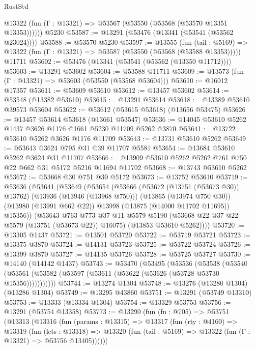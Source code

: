 \begin{lexlean}{RustStd}
\begin{coremodule}
      @13322 (fun (Γ : @13321) => @53567 (@53550 (@53568 (@53570 @13351 @13353))))))
    @5230
@53587 := @13291 (@53476 (@13341 (@53541 (@53562 @23024))))
@53588 := @53570 @5230
@53597 := @13555
    (fun (tail : @5169) => @13322 (fun (Γ : @13321) => @53587 (@53550 (@53568 (@53588 @13353)))))
    @11711
@53602 := @53476 (@13341 (@53541 (@53562 (@13350 @11712))))
@53603 := @13291 @53602
@53604 := @53588 @11711
@53609 := @13573 (fun (Γ : @13321) => @53603 (@53550 (@53568 @53604)))
@53610 := @16012 @17357
@53611 := @53609 @53610
@53612 := @13457 @53602
@53614 := @53548 (@13382 @53610)
@53615 := @13291 @53614
@53618 := @13389 @53610 @39573 @53604
@53622 := @53612 (@53615 @53618) (@13656 @53475)
@53626 := @13457 @53614 @53618 (@13661 @53547)
@53636 := @14045 @53610 @5262 @1437 @3626 @1176 @1661 @5230 @11709 @5262 @3870
@53641 := @13722 @53610 @5262 @3626 @1176 @11709
@53643 := @13731 @53610 @5262
@53649 := @53643 @3624 @795 @31 @39 @11707 @5581
@53654 := @13684 @53610 @5262 @3624 @31 @11707
@53666 := @13909 @53610 @5262 @5262 @761 @750 @22 @662 @31 @5172 @5216 @11694 @11702
@53668 := @13743 @53610 @5262
@53672 := @53668 @30 @751 @30 @5172
@53673 := @13752 @53610
@53719 := @53636
    (@53641
      (@53649
        (@53654
          (@53666
            (@53672 (@13751 (@53673 @30)) @13762)
            (@13936 (@13946 (@13968 @750)))
            (@13865 (@13974 @750 @30))
            (@13980 (@13991 @662 @22))
            @13998
            (@13875 (@14000 @11702 @11695))
            @15356))
        (@53643
          @763
          @773
          @37
          @11
          @5579
          @5190
          (@53668 @22 @37 @22 @5579 (@13751 (@53673 @22)) @16075)
          (@13853 @53610 @5262))))
@53720 := @13305 @1437
@53721 := @13501 @53720
@53722 := @53719 @53721
@53723 := @13375 @3870
@53724 := @14131 @53723
@53725 := @53722 @53724
@53726 := @13399 @3870
@53727 := @14135 @53726
@53728 := @53725 @53727
@53730 := @14140 (@14142 @1437)
@53743 := @53470
    (@53495
      (@53536
        (@53538
          (@53540 (@53561 (@53582 (@53597 (@53611 (@53622 (@53626 (@53728 @53730 @15356)))))))))))
@53744 := @13274 @1304
@53748 := @13276 (@13280 @1304) (@13286 @1304)
@53749 := @13295 @43860
@53751 := @13291 (@53749 @13310)
@53753 := @13333 (@13334 @1304)
@53754 := @13329 @53753
@53756 := @13291 (@53754 @13358)
@53773 := @13290
    (fun (fn : @705) =>
    @53751
      (@13313
        (@13316
          (fun (params : @13315) =>
          @13317
            (fun (rty : @4160) =>
            @13319
              (fun (lets : @13318) =>
              @13320 (fun (tail : @5169) => @13322 (fun (Γ : @13321) => @53756 @13405))))))

\end{coremodule}
\end{lexlean}
